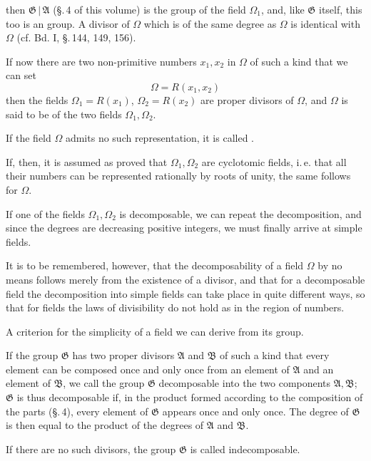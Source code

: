 then $\mathfrak{G}\,|\,\mathfrak{A}$ (\S.\,4 of this volume) is the group of the field $\Omega_1$, and,
like $\mathfrak{G}$ itself, this too is an  group. A divisor
of $\Omega$ which is of the same degree as $\Omega$ is identical with $\Omega$
(cf. Bd. I, \S.\,144, 149, 156).

If now there are two non-primitive numbers $x_1, x_2$ in $\Omega$ of
such a kind that we can set
\[
\Omega = R(x_1, x_2)
\]
then the fields $\Omega_1 = R(x_1)$, $\Omega_2 = R(x_2)$ are
proper divisors of $\Omega$, and $\Omega$ is said to be  of the two fields
$\Omega_1, \Omega_2$.

If the field $\Omega$ admits no such representation, it is called
.

If, then, it is assumed as proved that $\Omega_1, \Omega_2$ are
cyclotomic fields, i.\,e. that all their numbers can be represented
rationally by roots of unity, the same follows for $\Omega$.

If one of the fields $\Omega_1, \Omega_2$ is decomposable, we can
repeat the decomposition, and since the degrees are decreasing
positive integers, we must finally arrive at simple
fields.


It is to be remembered, however, that the decomposability of a
field $\Omega$ by no means follows merely from the existence of a
divisor, and that for a decomposable field the decomposition into
simple fields can take place in quite different ways, so
that for fields the laws of divisibility do not hold
as in the region of numbers.

A criterion for the simplicity of a field we can
derive from its group.

If the group $\mathfrak{G}$ has two proper divisors $\mathfrak{A}$ and $\mathfrak{B}$ of such a
kind that every element can be composed once and only once from an
element of $\mathfrak{A}$ and an element of $\mathfrak{B}$, we call the group
$\mathfrak{G}$ decomposable into the two
components $\mathfrak{A}, \mathfrak{B}$; $\mathfrak{G}$ is thus decomposable if, in the product
formed according to the composition of the parts (\S.\,4), every
element of $\mathfrak{G}$ appears once and only once. The degree
of $\mathfrak{G}$ is then equal to the product of the degrees of $\mathfrak{A}$ and $\mathfrak{B}$.

If there are no such divisors, the group $\mathfrak{G}$ is called
indecomposable.
